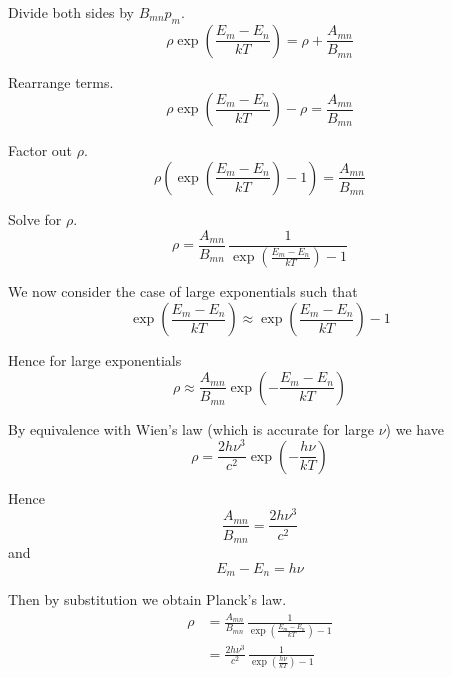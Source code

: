 \documentclass[12pt]{article}
\newcommand\BMN{B_{mn}} %
\newcommand\AMN{A_{mn}} %
\newcommand\RHO{\rho}
\newcommand\ABSORPTION{\substack{\\[1ex] \text{absorption}}}
\newcommand\INDUCED{\substack{\\[1ex] \text{induced}\\ \text{emission}}}
\newcommand\SPONTANEOUS{\substack{\\[1ex] \text{spontaneous}\\ \text{emission}}}
\begin{document}
Divide both sides by $\BMN p_m$.
\begin{equation*}
\RHO\exp\left(\frac{E_m-E_n}{kT}\right)
=\RHO+\frac{\AMN}{\BMN}
\end{equation*}

Rearrange terms.
\begin{equation*}
\RHO\exp\left(\frac{E_m-E_n}{kT}\right)
-\RHO=\frac{\AMN}{\BMN}
\end{equation*}

Factor out $\RHO$.
\begin{equation*}
\RHO\left(\exp\left(\frac{E_m-E_n}{kT}\right)-1\right)
=\frac{\AMN}{\BMN}
\end{equation*}

Solve for $\RHO$.
\begin{equation*}
\RHO
=\frac{\AMN}{\BMN}\,\frac{1}{\exp\left(\frac{E_m-E_n}{kT}\right)-1}
\end{equation*}

We now consider the case of large exponentials such that
\begin{equation*}
\exp\left(\frac{E_m-E_n}{kT}\right)\approx\exp\left(\frac{E_m-E_n}{kT}\right)-1
\end{equation*}

Hence for large exponentials
\begin{equation*}
\RHO\approx
\frac{\AMN}{\BMN}\exp\left(-\frac{E_m-E_n}{kT}\right)
\end{equation*}

By equivalence with Wien's law (which is accurate for large $\nu$) we have
\begin{equation*}
\RHO=\frac{2h\nu^3}{c^2}\exp\left(-\frac{h\nu}{kT}\right)
\end{equation*}

Hence
\begin{equation*}
\frac{\AMN}{\BMN}=\frac{2h\nu^3}{c^2}
\tag{4}
\end{equation*}
and
\begin{equation*}
E_m-E_n=h\nu
\end{equation*}

Then by substitution we obtain Planck's law.
\begin{align*}
\RHO
&=\frac{\AMN}{\BMN}\,\frac{1}{\exp\left(\frac{E_m-E_n}{kT}\right)-1}
\\[1.5ex]
&=\frac{2h\nu^3}{c^2}\,\frac{1}{\exp\left(\frac{h\nu}{kT}\right)-1}
\end{align*}
\end{document}
